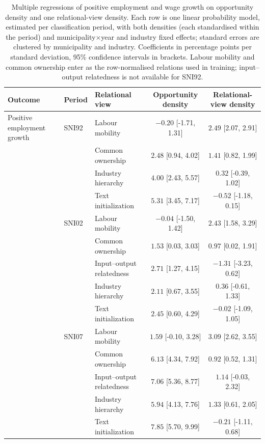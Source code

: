 \begin{table}[htbp]
\centering
\scriptsize
\caption{Multiple regressions of positive employment and wage growth on opportunity density and one relational-view density. Each row is one linear probability model, estimated per classification period, with both densities (each standardised within the period) and municipality$\times$year and industry fixed effects; standard errors are clustered by municipality and industry. Coefficients in percentage points per standard deviation, 95\% confidence intervals in brackets. Labour mobility and common ownership enter as the row-normalised relations used in training; input--output relatedness is not available for SNI92.}
\label{tab:multiple_regression_growth}
\begin{tabular}{lllcc}
\toprule
Outcome & Period & Relational view & Opportunity density & Relational-view density \\
\midrule
Positive employment growth & SNI92 & Labour mobility & $-0.20$ [-1.71, 1.31] & $2.49$ [2.07, 2.91] \\
 &  & Common ownership & $2.48$ [0.94, 4.02] & $1.41$ [0.82, 1.99] \\
 &  & Industry hierarchy & $4.00$ [2.43, 5.57] & $0.32$ [-0.39, 1.02] \\
 &  & Text initialization & $5.31$ [3.45, 7.17] & $-0.52$ [-1.18, 0.15] \\
\addlinespace[2pt]
 & SNI02 & Labour mobility & $-0.04$ [-1.50, 1.42] & $2.43$ [1.58, 3.29] \\
 &  & Common ownership & $1.53$ [0.03, 3.03] & $0.97$ [0.02, 1.91] \\
 &  & Input--output relatedness & $2.71$ [1.27, 4.15] & $-1.31$ [-3.23, 0.62] \\
 &  & Industry hierarchy & $2.11$ [0.67, 3.55] & $0.36$ [-0.61, 1.33] \\
 &  & Text initialization & $2.45$ [0.60, 4.29] & $-0.02$ [-1.09, 1.05] \\
\addlinespace[2pt]
 & SNI07 & Labour mobility & $1.59$ [-0.10, 3.28] & $3.09$ [2.62, 3.55] \\
 &  & Common ownership & $6.13$ [4.34, 7.92] & $0.92$ [0.52, 1.31] \\
 &  & Input--output relatedness & $7.06$ [5.36, 8.77] & $1.14$ [-0.03, 2.32] \\
 &  & Industry hierarchy & $5.94$ [4.13, 7.76] & $1.33$ [0.61, 2.05] \\
 &  & Text initialization & $7.85$ [5.70, 9.99] & $-0.21$ [-1.11, 0.68] \\

\end{tabular}
\end{table}
